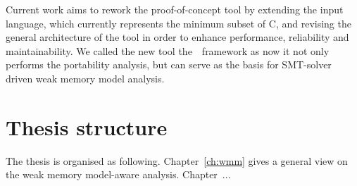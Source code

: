 Current work aims to rework the proof-of-concept tool \Porthos by extending the input language, which currently represents the minimum subset of C, and revising the general architecture of the tool in order to enhance performance, reliability and maintainability.
We called the new tool the~~framework as now it not only performs the portability analysis, but can serve as the basis for SMT-solver driven weak memory model analysis.

\section{Thesis structure}
\label{ch:intro:structure}

The thesis is organised as following. Chapter~\ref{ch:wmm} gives a general view on the weak memory model-aware analysis. Chapter~...


